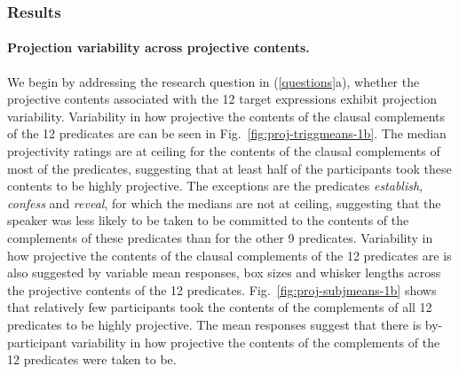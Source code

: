 \documentclass[11pt,fleqn]{article}
\newcommand{\6}{\mbox{$[\hspace*{-.6mm}[$}}
\newcommand{\9}{\mbox{$]\hspace*{-.6mm}]$}}
\newcommand{\figref}[1]{Fig.~\ref{#1}}
\begin{document}
\subsubsection{Results}

\paragraph{Projection variability across projective contents.} We begin by addressing the research question in (\ref{questions}a), whether the projective contents associated with the 12 target expressions exhibit projection variability. Variability in how projective the contents of the clausal complements of the 12 predicates are can be seen in \figref{fig:proj-triggmeans-1b}. The median projectivity ratings are at ceiling for the contents of the clausal complements of most of the predicates, suggesting that at least half of the participants took these contents to be highly projective. The exceptions are the predicates {\em establish, confess} and {\em reveal}, for which the medians are not at ceiling, suggesting that the speaker was less likely to be taken to be committed to the contents of the complements of these predicates than for the other 9 predicates. Variability in how projective the contents of the clausal complements of the 12 predicates are is also suggested by variable mean responses, box sizes and whisker lengths across the projective contents of the 12 predicates. \figref{fig:proj-subjmeans-1b} shows that relatively few participants took the contents of the complements of all 12 predicates to be highly projective. The mean responses suggest that there is by-participant variability in how projective the contents of the complements of the 12 predicates were taken to be.
\end{document}
